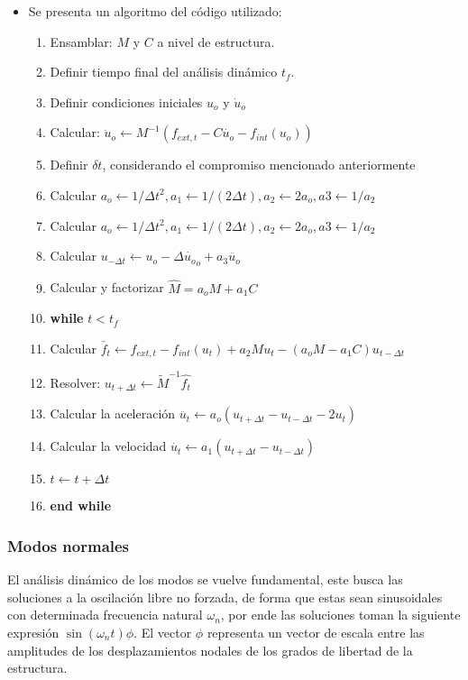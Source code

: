 \begin{itemize}
	\item Se presenta un algoritmo  del código utilizado:
	\begin{enumerate}
		\item Ensamblar: $M$ y $C$ a nivel de estructura.
		\item Definir tiempo final del análisis dinámico $t_f$.
		\item Definir condiciones iniciales $u_o$ y $\dot{u}_o$
		\item Calcular: $\ddot{u}_o\leftarrow M^{-1}(f_{ext,t}-C\dot{u_o}-f_{int}(u_o))$
		\item Definir  $\delta t$, considerando el compromiso mencionado anteriormente
		\item Calcular $a_o\leftarrow 1/\Delta t^2, a_1\leftarrow 1/(2\Delta t),a_2\leftarrow 2a_o,a3\leftarrow 1/a_2$
		\item Calcular $a_o\leftarrow 1/\Delta t^2, a_1\leftarrow 1/(2\Delta t),a_2\leftarrow 2a_o,a3\leftarrow 1/a_2$
		\item Calcular $u_{-\Delta t}\leftarrow u_o-\Delta \dot{u_o}_o+a_3\ddot{u_o} $
		\item Calcular y factorizar $\hat{M}=a_oM+a_1C $
		\item \textbf {while} $t<t_f$
		\item   \hspace{1cm} Calcular $\check{f_t}\leftarrow f_{ext,t}-f_{int}(u_t)+a_2Mu_t-(a_oM-a_1C)u_{t-\Delta t}$
		\item \hspace{1cm} Resolver: $ u_{t+\Delta t}\leftarrow \tilde{M}^{-1}\hat{f_t}$
		\item \hspace{1cm} Calcular la aceleración $\ddot {u_t}\leftarrow a_o(u_{t+\Delta t}-u_{t-\Delta t}-2u_t)$
		\item \hspace{1cm} Calcular la velocidad $\dot {u_t}\leftarrow a_1(u_{t+\Delta t}-u_{t-\Delta t})$
		\item\hspace{1cm} $t\leftarrow t+\Delta t$
		\item \textbf {end while}
	\end{enumerate}
\end{itemize}


\subsubsection{Modos normales}
El análisis dinámico de los modos se vuelve fundamental, este busca las soluciones a la oscilación libre no forzada, de forma que estas sean sinusoidales con determinada frecuencia natural $\omega_n$, por ende las soluciones toman la siguiente expresión $\sin (\omega_n t) \phi$. El vector $\phi$ representa un vector de escala entre las amplitudes de los desplazamientos nodales de los grados de libertad de la estructura.


